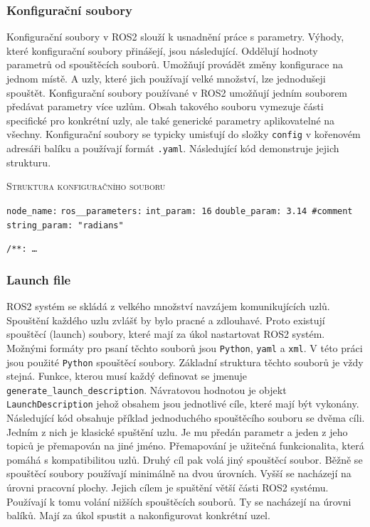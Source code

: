 \newpage
\subsubsection*{Konfigurační soubory}
Konfigurační soubory v ROS2 slouží k usnadnění práce s parametry. Výhody, které konfigurační soubory přinášejí, jsou následující. Oddělují hodnoty parametrů od spouštěcích souborů. Umožňují provádět změny konfigurace na jednom místě. A uzly, které jich používají velké množství, lze jednodušeji spouštět. Konfigurační soubory používané v ROS2 umožňují jedním souborem předávat parametry více uzlům. Obsah takového souboru vymezuje části specifické pro konkrétní uzly, ale také generické parametry aplikovatelné na všechny. Konfigurační soubory se typicky umisťují do složky \verb|config| v kořenovém adresáři balíku a používají formát \verb|.yaml|. Následující kód demonstruje jejich strukturu. \cite{ros2_documentation}

\begin{algorithm}[h!]
	\label{}
	\caption{\textsc{Struktura konfiguračního souboru}}
	
	\DontPrintSemicolon
	\SetAlgoNoLine
	\SetNlSty{}{}{:}
	\SetNlSkip{-1.1em}
	
	\BlankLine \Indp\Indpp
	
	\texttt{node\_name:}\;
	\Indp
	\texttt{ros\_\_parameters:}\;
	\Indp
	\texttt{int\_param: 16}\;
	\texttt{double\_param: 3.14 \#comment}\;
	\texttt{string\_param: "radians"}\;
	
	
	\BlankLine \Indm\Indm
	\texttt{/**: \dots}\;
	
\end{algorithm}

\subsubsection*{Launch file}
ROS2 systém se skládá z velkého množství navzájem komunikujících uzlů. Spouštění každého uzlu zvlášť by bylo pracné a zdlouhavé. Proto existují spouštěcí (launch) soubory, které mají za úkol nastartovat ROS2 systém. Možnými formáty pro psaní těchto souborů jsou \verb|Python|, \verb|yaml| a \verb|xml|. V této práci jsou použité \verb|Python| spouštěcí soubory. Základní struktura těchto souborů je vždy stejná. Funkce, kterou musí každý definovat se jmenuje \verb|generate_launch_description|. Návratovou hodnotou je objekt \verb|LaunchDescription| jehož obsahem jsou jednotlivé cíle, které mají být vykonány. Následující kód obsahuje příklad jednoduchého spouštěcího souboru se dvěma cíli. Jedním z nich je klasické spuštění uzlu. Je mu předán parametr a jeden z jeho topiců je přemapován na jiné jméno. Přemapování je užitečná funkcionalita, která pomáhá s kompatibilitou uzlů. Druhý cíl pak volá jiný spouštěcí soubor. Běžně se spouštěcí soubory používají minimálně na dvou úrovních. Vyšší se nacházejí na úrovni pracovní plochy. Jejich cílem je spuštění větší části ROS2 systému. Používají k tomu volání nižších spouštěcích souborů. Ty se nacházejí na úrovni balíků. Mají za úkol spustit a nakonfigurovat konkrétní uzel. \cite[str:~35-37]{ros2_introduction}

